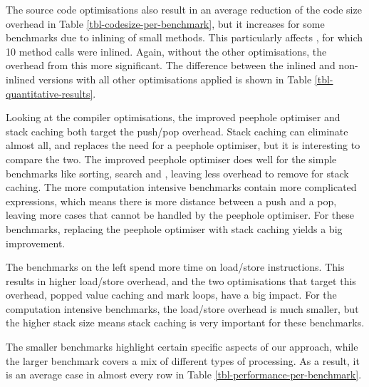 The source code optimisations also result in an average reduction of the code size overhead in Table \ref{tbl-codesize-per-benchmark}, but it increases for some benchmarks due to inlining of small methods. This particularly affects , for which 10 method calls were inlined. Again, without the other optimisations, the overhead from this more significant. The difference between the inlined and non-inlined versions with all other optimisations applied is shown in Table \ref{tbl-quantitative-results}.

Looking at the compiler optimisations, the improved peephole optimiser and stack caching both target the push/pop overhead. Stack caching can eliminate almost all, and replaces the need for a peephole optimiser, but it is interesting to compare the two. The improved peephole optimiser does well for the simple benchmarks like sorting,  search and , leaving less overhead to remove for stack caching. The more computation intensive benchmarks contain more complicated expressions, which means there is more distance between a push and a pop, leaving more cases that cannot be handled by the peephole optimiser. For these benchmarks, replacing the peephole optimiser with stack caching yields a big improvement.

The benchmarks on the left spend more time on load/store instructions. This results in higher load/store overhead, and the two optimisations that target this overhead, popped value caching and mark loops, have a big impact. For the computation intensive benchmarks, the load/store overhead is much smaller, but the higher stack size means stack caching is very important for these benchmarks.

The smaller benchmarks highlight certain specific aspects of our approach, while the larger  benchmark covers a mix of different types of processing. As a result, it is an average case in almost every row in Table \ref{tbl-performance-per-benchmark}.

